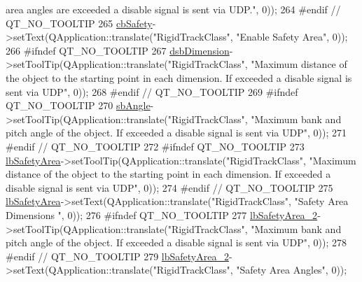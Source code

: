 \begin{DoxyCode}
{       area angles are exceeded a disable signal is sent via UDP."}, 0));
264 \textcolor{preprocessor}{#endif // QT\_NO\_TOOLTIP}
265         \hyperlink{class_ui___rigid_track_class_a44e812df547a219bdf2b43383a4e849b}{cbSafety}->setText(QApplication::translate(\textcolor{stringliteral}{"RigidTrackClass"}, \textcolor{stringliteral}{"Enable Safety Area"}, 0));
266 \textcolor{preprocessor}{#ifndef QT\_NO\_TOOLTIP}
267         \hyperlink{class_ui___rigid_track_class_a20f78b58534d29da3d836c2af79a6232}{dsbDimension}->setToolTip(QApplication::translate(\textcolor{stringliteral}{"RigidTrackClass"}, \textcolor{stringliteral}{"Maximum distance
       of the object to the starting point in each dimension. If exceeded a disable signal is sent via UDP"}, 0));
268 \textcolor{preprocessor}{#endif // QT\_NO\_TOOLTIP}
269 \textcolor{preprocessor}{#ifndef QT\_NO\_TOOLTIP}
270         \hyperlink{class_ui___rigid_track_class_ac232f3d19d53b00aa61431725cbf71c4}{sbAngle}->setToolTip(QApplication::translate(\textcolor{stringliteral}{"RigidTrackClass"}, \textcolor{stringliteral}{"Maximum bank and pitch angle
       of the object. If exceeded a disable signal is sent via UDP"}, 0));
271 \textcolor{preprocessor}{#endif // QT\_NO\_TOOLTIP}
272 \textcolor{preprocessor}{#ifndef QT\_NO\_TOOLTIP}
273         \hyperlink{class_ui___rigid_track_class_a0996dad75e113e08fcaee07e55ceaca6}{lbSafetyArea}->setToolTip(QApplication::translate(\textcolor{stringliteral}{"RigidTrackClass"}, \textcolor{stringliteral}{"Maximum distance
       of the object to the starting point in each dimension. If exceeded a disable signal is sent via UDP"}, 0));
274 \textcolor{preprocessor}{#endif // QT\_NO\_TOOLTIP}
275         \hyperlink{class_ui___rigid_track_class_a0996dad75e113e08fcaee07e55ceaca6}{lbSafetyArea}->setText(QApplication::translate(\textcolor{stringliteral}{"RigidTrackClass"}, \textcolor{stringliteral}{"Safety Area
       Dimensions "}, 0));
276 \textcolor{preprocessor}{#ifndef QT\_NO\_TOOLTIP}
277         \hyperlink{class_ui___rigid_track_class_ace9b8966d2c9a38ef4bd4ba17db70c5a}{lbSafetyArea\_2}->setToolTip(QApplication::translate(\textcolor{stringliteral}{"RigidTrackClass"}, \textcolor{stringliteral}{"Maximum bank
       and pitch angle of the object. If exceeded a disable signal is sent via UDP"}, 0));
278 \textcolor{preprocessor}{#endif // QT\_NO\_TOOLTIP}
279         \hyperlink{class_ui___rigid_track_class_ace9b8966d2c9a38ef4bd4ba17db70c5a}{lbSafetyArea\_2}->setText(QApplication::translate(\textcolor{stringliteral}{"RigidTrackClass"}, \textcolor{stringliteral}{"Safety Area
       Angles"}, 0));

\end{DoxyCode}
